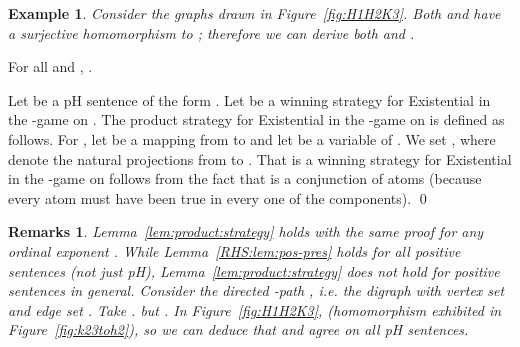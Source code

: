 \documentclass{LMCS}
\newtheorem{ex}{Example}
\newtheorem*{remarks}{Remarks}
\begin{document}
\begin{ex}
\label{ex:graphs}
Consider the graphs drawn in Figure~\ref{fig:H1H2K3}. Both  and  have a surjective homomorphism to ; therefore we can derive both  and .
\end{ex}
\begin{figure*}
  \centering
  \caption{Two graphs and a homomorphic image.}
  \label{fig:H1H2K3}
\end{figure*}
\begin{lem}
\label{lem:product:strategy}
For all  and , .
\end{lem}
\proof
Let  be a pH sentence of the form   . Let  be a winning strategy for Existential in the -game on . The product strategy  for Existential in the -game on  is defined as follows.
For , let  be a mapping from  to  and let  be a variable of . We set 
, 
where  denote the natural projections from  to . That  is a winning strategy for Existential in the -game on  follows from the fact that  is a conjunction of atoms (because every atom must have been true in every one of the  components).
\qed
\begin{remarks}
Lemma~\ref{lem:product:strategy} holds with the same proof for any ordinal exponent .
While Lemma~\ref{RHS:lem:pos-pres} holds for all positive sentences (not just pH), Lemma~\ref{lem:product:strategy} does not hold for positive sentences in general. Consider the directed -path , \mbox{i.e.} the digraph with vertex set  and edge set . Take .  but . In Figure~\ref{fig:H1H2K3},  (homomorphism exhibited in Figure~\ref{fig:k23toh2}), so we can deduce that  and  agree on all pH sentences.
\end{remarks}
\end{document}
